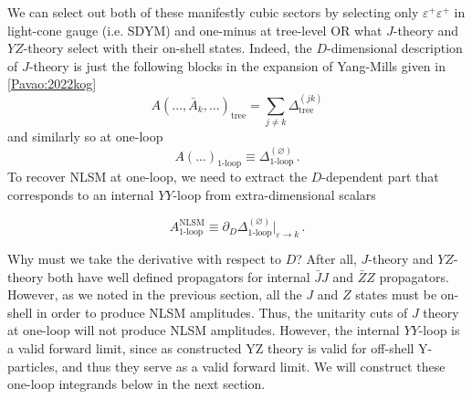 \documentclass[11pt,letter]{article}
\begin{document}
We can select out both of these manifestly cubic sectors by selecting
only $\varepsilon^+\varepsilon^+$ in light-cone gauge (i.e. SDYM) and
one-minus at tree-level OR what $J$-theory and $YZ$-theory select with
their on-shell states. Indeed, the $D$-dimensional description of
$J$-theory is just the following blocks in the expansion of Yang-Mills
given in \ref{Pavao:2022kog}
\begin{equation}
A(...,\bar{A}_k,...)_{\text{tree}} = \sum_{j\neq k}\Delta^{(jk)}_{\text{tree}}
\end{equation}
and similarly so at one-loop
\begin{equation}
A(...)_{\text{1-loop}} \equiv \Delta^{(\varnothing)}_{\text{1-loop}}\, .
\end{equation}
To recover NLSM at one-loop, we need to extract the $D$-dependent part
that corresponds to an internal $YY$-loop from extra-dimensional
scalars
\begin{eBox}
\begin{equation}
A^{\text{NLSM}}_{\text{1-loop}} \equiv \partial_D \Delta^{(\varnothing)}_{\text{1-loop}}\big|_{\varepsilon\rightarrow k}\, .
\end{equation}
\end{eBox}
Why must we take the derivative with respect to $D$? After all,
$J$-theory and $YZ$-theory both have well defined propagators for
internal $\bar{J}J$ and $\bar{Z}Z$ propagators. However, as we noted
in the previous section, all the $J$ and $Z$ states must be on-shell
in order to produce NLSM amplitudes. Thus, the unitarity cuts of $J$
theory at one-loop will not produce NLSM amplitudes. However, the
internal $YY$-loop is a valid forward limit, since as constructed YZ
theory is valid for off-shell Y-particles, and thus they serve as a
valid forward limit. We will construct these one-loop integrands below
in the next section.
\end{document}
